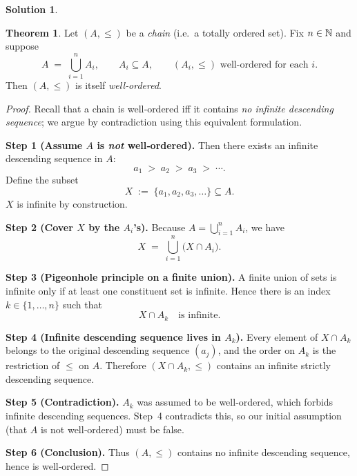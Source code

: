 \documentclass[12pt]{article}
\theoremstyle{definition} %
\newtheorem{solution}{Solution}
\newtheorem{theorem}{Theorem}
\theoremstyle{plain} %
\begin{document}
    \begin{solution}
      \begin{theorem}
        Let $(A,\le)$ be a \emph{chain} (i.e.\ a totally ordered set).
        Fix $n\in\Bbb N$ and suppose
        \[
           A \;=\; \bigcup_{i=1}^{n} A_i,
           \qquad
           A_i\subseteq A,
           \qquad
           (A_i,\le)\text{ well‑ordered for each }i.
        \]
        Then $(A,\le)$ is itself \emph{well‑ordered}.
        \end{theorem}
        
        \begin{proof}
        Recall that a chain is well‑ordered iff it contains
        \emph{no infinite descending sequence};
        we argue by contradiction using this equivalent formulation.
        
        \medskip
        \textbf{Step 1 (Assume $A$ is \emph{not} well‑ordered).}
        Then there exists an infinite descending sequence in $A$:
        \[
           a_1 \;>\; a_2 \;>\; a_3 \;>\;\cdots .
        \]
        Define the subset
        \[
           X \;:=\; \{a_1,a_2,a_3,\dots\}\subseteq A .
        \]
        $X$ is infinite by construction.
        
        \medskip
        \textbf{Step 2 (Cover $X$ by the $A_i$’s).}
        Because $A=\bigcup_{i=1}^{n}A_i$, we have
        \[
           X
           \;=\;
           \bigcup_{i=1}^{n}\!\bigl(X\cap A_i\bigr).
        \]
        
        \medskip
        \textbf{Step 3 (Pigeonhole principle on a finite union).}
        A finite union of sets is infinite
        only if at least one constituent set is infinite.
        Hence there is an index $k\in\{1,\dots,n\}$ such that
        \[
           X\cap A_k\quad\text{is infinite.}
        \]
        
        \medskip
        \textbf{Step 4 (Infinite descending sequence lives in $A_k$).}
        Every element of $X\cap A_k$ belongs to the original
        descending sequence $(a_j)$, and the order on $A_k$
        is the restriction of $\le$ on $A$.
        Therefore $(X\cap A_k,\le)$ contains an infinite
        strictly descending sequence.
        
        \medskip
        \textbf{Step 5 (Contradiction).}
        $A_k$ was assumed to be well‑ordered, which forbids
        infinite descending sequences.
        Step~4 contradicts this,
        so our initial assumption (that $A$ is not well‑ordered)
        must be false.
        
        \medskip
        \textbf{Step 6 (Conclusion).}
        Thus $(A,\le)$ contains no infinite descending sequence,
        hence is well‑ordered.
        \end{proof}      
    \end{solution}
\end{document}
